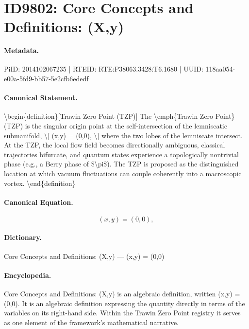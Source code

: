 \section*{ID9802: Core Concepts and Definitions: (X,y)}
\paragraph{Metadata.}
PiID: 2014102067235 | RTEID: RTE:P38063.3428:T6.1680 | UUID: 118aa054-e00a-5fd9-bb57-5e2cfb6ededf

\paragraph{Canonical Statement.}
\textbackslash{}begin\{definition\}[Trawin Zero Point (TZP)] The \textbackslash{}emph\{Trawin Zero Point\} (TZP) is the singular origin point at the self-intersection of the lemniscatic submanifold, \textbackslash{}[ (x,y) = (0,0), \textbackslash{}] where the two lobes of the lemniscate intersect. At the TZP, the local flow field becomes directionally ambiguous, classical trajectories bifurcate, and quantum states experience a topologically nontrivial phase (e.g., a Berry phase of \$\textbackslash{}pi\$). The TZP is proposed as the distinguished location at which vacuum fluctuations can couple coherently into a macroscopic vortex. \textbackslash{}end\{definition\}

\paragraph{Canonical Equation.}
\[
(x,y) = (0,0),
\]

\paragraph{Dictionary.}
Core Concepts and Definitions: (X,y) — (x,y) = (0,0)

\paragraph{Encyclopedia.}
Core Concepts and Definitions: (X,y) is an algebraic definition, written (x,y) = (0,0). It is an algebraic definition expressing the quantity directly in terms of the variables on its right-hand side. Within the Trawin Zero Point registry it serves as one element of the framework's mathematical narrative.
